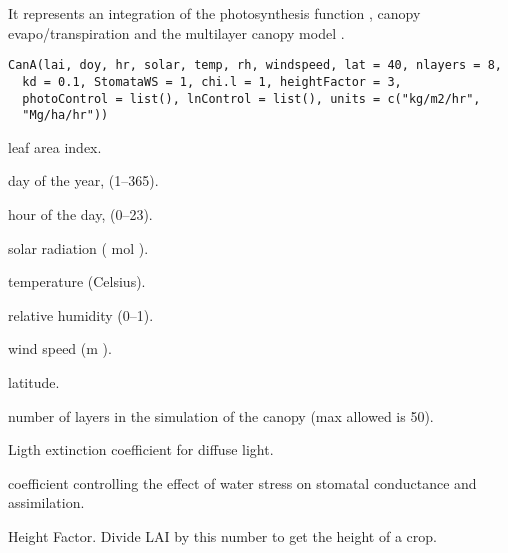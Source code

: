 \documentclass[letterpaper]{book}
\begin{document}
%
\begin{Description}\relax
It represents an integration of the photosynthesis function
, canopy evapo/transpiration and the
multilayer canopy model .
\end{Description}
%
\begin{Usage}
\begin{verbatim}
CanA(lai, doy, hr, solar, temp, rh, windspeed, lat = 40, nlayers = 8,
  kd = 0.1, StomataWS = 1, chi.l = 1, heightFactor = 3,
  photoControl = list(), lnControl = list(), units = c("kg/m2/hr",
  "Mg/ha/hr"))
\end{verbatim}
\end{Usage}
%
\begin{Arguments}
\begin{ldescription}
\item[\code{lai}] leaf area index.

\item[\code{doy}] day of the year, (1--365).

\item[\code{hr}] hour of the day, (0--23).

\item[\code{solar}] solar radiation (\eqn{\mu}{} mol
 ).

\item[\code{temp}] temperature (Celsius).

\item[\code{rh}] relative humidity (0--1).

\item[\code{windspeed}] wind speed (m ).

\item[\code{lat}] latitude.

\item[\code{nlayers}] number of layers in the simulation of the
canopy (max allowed is 50).

\item[\code{kd}] Ligth extinction coefficient for diffuse
light.

\item[\code{StomataWS}] coefficient controlling the effect of
water stress on stomatal conductance and assimilation.

\item[\code{heightFactor}] Height Factor. Divide LAI by this
number to get the height of a crop.


\end{ldescription}
\end{Arguments}
\end{document}

